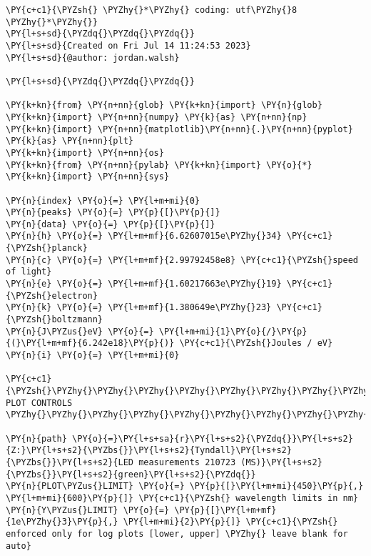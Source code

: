
    \begin{tcolorbox}[breakable, size=fbox, boxrule=1pt, pad at break*=1mm,colback=cellbackground, colframe=cellborder]
\begin{Verbatim}[commandchars=\\\{\}]
\PY{c+c1}{\PYZsh{} \PYZhy{}*\PYZhy{} coding: utf\PYZhy{}8 \PYZhy{}*\PYZhy{}}
\PY{l+s+sd}{\PYZdq{}\PYZdq{}\PYZdq{}}
\PY{l+s+sd}{Created on Fri Jul 14 11:24:53 2023}
\PY{l+s+sd}{@author: jordan.walsh}

\PY{l+s+sd}{\PYZdq{}\PYZdq{}\PYZdq{}}

\PY{k+kn}{from} \PY{n+nn}{glob} \PY{k+kn}{import} \PY{n}{glob}
\PY{k+kn}{import} \PY{n+nn}{numpy} \PY{k}{as} \PY{n+nn}{np}
\PY{k+kn}{import} \PY{n+nn}{matplotlib}\PY{n+nn}{.}\PY{n+nn}{pyplot} \PY{k}{as} \PY{n+nn}{plt} 
\PY{k+kn}{import} \PY{n+nn}{os}
\PY{k+kn}{from} \PY{n+nn}{pylab} \PY{k+kn}{import} \PY{o}{*}
\PY{k+kn}{import} \PY{n+nn}{sys}

\PY{n}{index} \PY{o}{=} \PY{l+m+mi}{0}
\PY{n}{peaks} \PY{o}{=} \PY{p}{[}\PY{p}{]}
\PY{n}{data} \PY{o}{=} \PY{p}{[}\PY{p}{]}
\PY{n}{h} \PY{o}{=} \PY{l+m+mf}{6.62607015e\PYZhy{}34} \PY{c+c1}{\PYZsh{}planck}
\PY{n}{c} \PY{o}{=} \PY{l+m+mf}{2.99792458e8} \PY{c+c1}{\PYZsh{}speed of light}
\PY{n}{e} \PY{o}{=} \PY{l+m+mf}{1.60217663e\PYZhy{}19} \PY{c+c1}{\PYZsh{}electron}
\PY{n}{k} \PY{o}{=} \PY{l+m+mf}{1.380649e\PYZhy{}23} \PY{c+c1}{\PYZsh{}boltzmann}
\PY{n}{J\PYZus{}eV} \PY{o}{=} \PY{l+m+mi}{1}\PY{o}{/}\PY{p}{(}\PY{l+m+mf}{6.242e18}\PY{p}{)} \PY{c+c1}{\PYZsh{}Joules / eV}
\PY{n}{i} \PY{o}{=} \PY{l+m+mi}{0}

\PY{c+c1}{\PYZsh{}\PYZhy{}\PYZhy{}\PYZhy{}\PYZhy{}\PYZhy{}\PYZhy{}\PYZhy{}\PYZhy{}\PYZhy{}\PYZhy{}\PYZhy{}\PYZhy{}\PYZhy{}\PYZhy{}\PYZhy{}\PYZhy{}\PYZhy{}\PYZhy{}\PYZhy{}\PYZhy{}\PYZhy{}\PYZhy{}\PYZhy{}\PYZhy{}\PYZhy{}\PYZhy{}\PYZhy{}\PYZhy{}\PYZhy{}\PYZhy{}\PYZhy{} PLOT CONTROLS \PYZhy{}\PYZhy{}\PYZhy{}\PYZhy{}\PYZhy{}\PYZhy{}\PYZhy{}\PYZhy{}\PYZhy{}\PYZhy{}\PYZhy{}\PYZhy{}\PYZhy{}\PYZhy{}\PYZhy{}\PYZhy{}\PYZhy{}\PYZhy{}\PYZhy{}\PYZhy{}\PYZhy{}\PYZhy{}\PYZhy{}\PYZhy{}\PYZhy{}\PYZhy{}\PYZhy{}\PYZhy{}\PYZhy{}\PYZhy{}\PYZhy{}\PYZsh{}}

\PY{n}{path} \PY{o}{=}\PY{l+s+sa}{r}\PY{l+s+s2}{\PYZdq{}}\PY{l+s+s2}{Z:}\PY{l+s+s2}{\PYZbs{}}\PY{l+s+s2}{Tyndall}\PY{l+s+s2}{\PYZbs{}}\PY{l+s+s2}{LED measurements 210723 (MS)}\PY{l+s+s2}{\PYZbs{}}\PY{l+s+s2}{green}\PY{l+s+s2}{\PYZdq{}}
\PY{n}{PLOT\PYZus{}LIMIT} \PY{o}{=} \PY{p}{[}\PY{l+m+mi}{450}\PY{p}{,} \PY{l+m+mi}{600}\PY{p}{]} \PY{c+c1}{\PYZsh{} wavelength limits in nm}
\PY{n}{Y\PYZus{}LIMIT} \PY{o}{=} \PY{p}{[}\PY{l+m+mf}{1e\PYZhy{}3}\PY{p}{,} \PY{l+m+mi}{2}\PY{p}{]} \PY{c+c1}{\PYZsh{} enforced only for log plots [lower, upper] \PYZhy{} leave blank for auto}


\end{Verbatim}
\end{tcolorbox}
